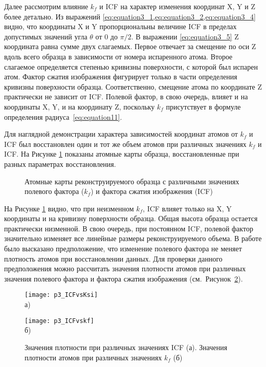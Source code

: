 Далее рассмотрим влияние $k_f$ и ICF на характер изменения координат X, Y и Z более детально. Из выражений \cref{eq:equation3_1,eq:equation3_2,eq:equation3_4} видно, что координаты X и Y  пропорциональны величине ICF в пределах допустимых значений угла $\theta$ от 0 до $\pi/2$. В выражении \cref{eq:equation3_5} Z координата равна сумме двух слагаемых. Первое отвечает за смещение по оси Z вдоль всего образца в зависимости от номера испаренного атома. Второе слагаемое определяется степенью кривизны поверхности, с которой был испарен атом. Фактор сжатия изображения фигурирует только в части определения кривизны поверхности образца. Соответственно, смещение атома по координате Z практически не зависит от ICF. Полевой фактор, в свою очередь, влияет и на координаты X, Y, и на координату Z, поскольку $k_f$ присутствует в формуле определения радиуса~\cref{eq:equation11}.

Для наглядной демонстрации характера зависимостей координат атомов от $k_f$ и ICF был восстановлен один и тот же объем атомов при различных значениях $k_f$ и ICF. На Рисунке \cref{fig:p3_3Dparts} показаны атомные карты образца, восстановленные при разных параметрах восстановления.

\begin{figure}[htb]
	\caption{Атомные карты реконструируемого образца с различными значениях полевого фактора ($k_f$) и фактора сжатия изображения (ICF) \cite{scbibDensity}}
	\label{fig:p3_3Dparts}
\end{figure}

На Рисунке \cref{fig:p3_3Dparts} видно, что при неизменном $k_f$, ICF  влияет только на X, Y координаты и на кривизну поверхности образца. Общая высота образца остается практически низменной. В свою очередь, при постоянном ICF, полевой фактор значительно изменяет все линейные размеры реконструируемого объема. В работе \cite{scbibDensity} было высказано предположение, что изменение полевого фактора не меняет плотность атомов при восстановлении данных. Для проверки данного предположения можно рассчитать значения плотности атомов при различных значения полевого фактора и фактора сжатия изображения (см.~Рисунок~\cref{fig:p3_ICF}).

\begin{figure}[htb]
	\begin{minipage}[b][][b]{0.49\textwidth}\centering
		\texttt{[image: p3\_ICFvsKsi]} \\ а)
	\end{minipage}
	\begin{minipage}[b][][b]{0.49\textwidth}\centering
		\texttt{[image: p3\_ICFvskf]} \\ б)
	\end{minipage}
	\caption{Значения плотности при различных значениях ICF (а). Значения плотности атомов при различных значениях $k_f$ (б) \cite{scbibDensity}}
	\label{fig:p3_ICF}
\end{figure}

